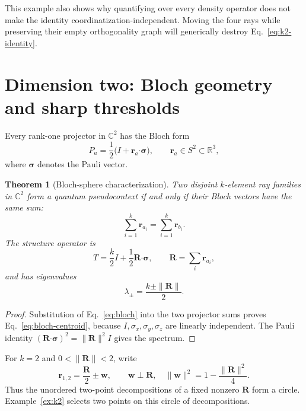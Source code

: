 \documentclass[
  twocolumn,
  aps,
  pra,
  floatfix,
  amsmath,amssymb,
  longbibliography
]{revtex4-2}
\newtheorem{theorem}{Theorem}
\theoremstyle{definition}
\theoremstyle{remark}
\newcommand{\R}{\mathbb R}
\newcommand{\C}{\mathbb C}
\newcommand{\1}{\mathbf 1}
\begin{document}
This example also shows why quantifying over every density operator does not
make the identity coordinatization-independent.  Moving the four rays while
preserving their empty orthogonality graph will generically destroy
Eq.~\eqref{eq:k2-identity}.

\section{Dimension two: Bloch geometry and sharp thresholds}
\label{sec:bloch}

Every rank-one projector in $\C^2$ has the Bloch form
\begin{equation}
 P_a=\frac12\bigl(I+\boldsymbol r_a\boldsymbol\cdot\boldsymbol\sigma\bigr),
 \qquad \boldsymbol r_a\in S^2\subset\R^3,
 \label{eq:bloch}
\end{equation}
where $\boldsymbol\sigma$ denotes the Pauli vector.

\begin{theorem}[Bloch-sphere characterization]
\label{thm:bloch}
Two disjoint $k$-element ray families in $\C^2$ form a quantum
pseudocontext if and only if their Bloch vectors have the same sum:
\begin{equation}
 \sum_{i=1}^{k}\boldsymbol r_{a_i}
 =\sum_{i=1}^{k}\boldsymbol r_{b_i}.
 \label{eq:bloch-centroid}
\end{equation}
The structure operator is
\begin{equation}
 T=\frac{k}{2}I+\frac12\boldsymbol R\boldsymbol\cdot\boldsymbol\sigma,
 \qquad \boldsymbol R=\sum_i\boldsymbol r_{a_i},
 \label{eq:bloch-T}
\end{equation}
and has eigenvalues
\begin{equation}
 \lambda_\pm=\frac{k\pm\|\boldsymbol R\|}{2}.
 \label{eq:bloch-spectrum}
\end{equation}
\end{theorem}

\begin{proof}
Substitution of Eq.~\eqref{eq:bloch} into the two projector sums proves
Eq.~\eqref{eq:bloch-centroid}, because
$I,\sigma_x,\sigma_y,\sigma_z$ are linearly independent.  The Pauli identity
$(\boldsymbol R\boldsymbol\cdot\boldsymbol\sigma)^2=\|\boldsymbol R\|^2I$
gives the spectrum.
\end{proof}

For $k=2$ and $0<\|\boldsymbol R\|<2$, write
\begin{equation}
 \boldsymbol r_{1,2}=\frac{\boldsymbol R}{2}\pm\boldsymbol w,
 \qquad \boldsymbol w\perp\boldsymbol R,\quad
 \|\boldsymbol w\|^2=1-\frac{\|\boldsymbol R\|^2}{4}.
 \label{eq:bloch-circle}
\end{equation}
Thus the unordered two-point decompositions of a fixed nonzero
$\boldsymbol R$ form a circle.  Example~\ref{ex:k2} selects two points on
this circle of decompositions.
\end{document}
